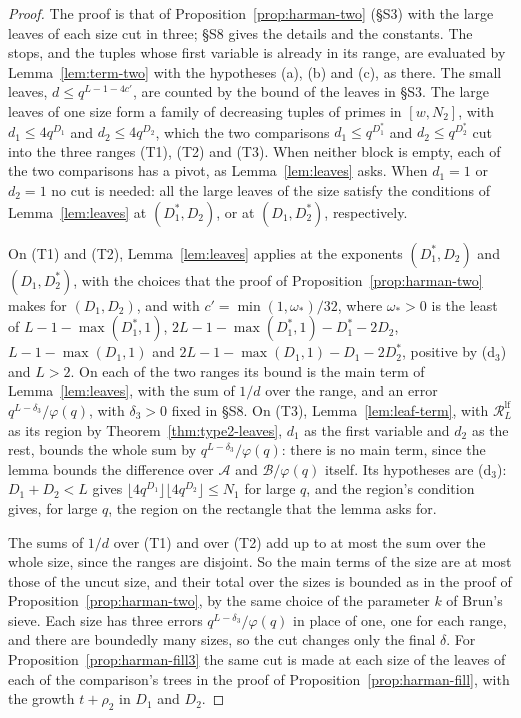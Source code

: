 \documentclass[11pt]{article}
\theoremstyle{definition}
\begin{document}
\begin{proof}
The proof is that of Proposition~\ref{prop:harman-two} (\S S3) with the large leaves of each size cut in three; \S S8
gives the details and the constants. The stops, and the tuples whose first variable is already in its range, are
evaluated by Lemma~\ref{lem:term-two} with the hypotheses (a), (b) and (c), as there. The small leaves, $d \le q^{L - 1
- 4c'}$, are counted by the bound of the leaves in \S S3. The large leaves of one size form a family of decreasing
tuples of primes in $[w, N_2]$, with $d_1 \le 4q^{D_1}$ and $d_2 \le 4q^{D_2}$, which the two comparisons $d_1 \le
q^{D_1^*}$ and $d_2 \le q^{D_2^*}$ cut into the three ranges (T1), (T2) and (T3). When neither block is empty, each of
the two comparisons has a pivot, as Lemma~\ref{lem:leaves} asks. When $d_1 = 1$ or $d_2 = 1$ no cut is needed: all the
large leaves of the size satisfy the conditions of Lemma~\ref{lem:leaves} at $(D_1^*, D_2)$, or at $(D_1, D_2^*)$,
respectively.

On (T1) and (T2), Lemma~\ref{lem:leaves} applies at the exponents $(D_1^*, D_2)$ and $(D_1, D_2^*)$, with the choices
that the proof of Proposition~\ref{prop:harman-two} makes for $(D_1, D_2)$, and with $c' = \min(1, \omega_*)/32$, where
$\omega_* > 0$ is the least of $L - 1 - \max(D_1^*, 1)$, $2L - 1 - \max(D_1^*, 1) - D_1^* - 2D_2$, $L - 1 - \max(D_1,
1)$ and $2L - 1 - \max(D_1, 1) - D_1 - 2D_2^*$, positive by (d$_3$) and $L > 2$. On each of the two ranges its bound is
the main term of Lemma~\ref{lem:leaves}, with the sum of $1/d$ over the range, and an error $q^{L -
\delta_3}/\varphi(q)$, with $\delta_3 > 0$
fixed in \S S8. On (T3), Lemma~\ref{lem:leaf-term}, with $\mathcal R^{\mathrm{lf}}_L$ as its region by
Theorem~\ref{thm:type2-leaves}, $d_1$ as the first variable and $d_2$ as the rest, bounds the whole sum by $q^{L -
\delta_3}/\varphi(q)$: there is no main term, since the lemma bounds the difference over $\mathcal A$ and $\mathcal
B/\varphi(q)$ itself. Its hypotheses are (d$_3$): $D_1 + D_2 < L$ gives $\lfloor 4q^{D_1} \rfloor \lfloor 4q^{D_2}
\rfloor \le N_1$ for large $q$, and the region's condition gives, for large $q$, the region on the rectangle that the
lemma asks for.

The sums of $1/d$ over (T1) and over (T2) add up to at most the sum over the whole size, since the ranges are
disjoint. So the main terms of the size are at most those of the uncut size, and their total over the sizes is
bounded as in the proof of Proposition~\ref{prop:harman-two}, by the same choice of the parameter $k$ of Brun's sieve.
Each size has three errors $q^{L - \delta_3}/\varphi(q)$ in place of one, one for each range, and there are boundedly
many sizes, so the cut changes only the final $\delta$. For Proposition~\ref{prop:harman-fill3} the same cut is made at
each size of the leaves of each of the comparison's trees in the proof of Proposition~\ref{prop:harman-fill}, with the
growth $t + \rho_2$ in $D_1$ and $D_2$.
\end{proof}
\end{document}
